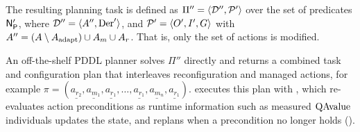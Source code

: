 The resulting planning task is defined as $\Pi'' = \langle \mathcal{D}'', \mathcal{P}' \rangle$ over the set of predicates $\mathsf{N}_\mathsf{P}'$, where $\mathcal{D}'' = \langle A'', \text{Der}' \rangle$, and $\mathcal{P}'= \langle O', I', G \rangle$ with $A'' = (A \setminus A_{\text{adapt}}) \cup A_m \cup A_r$. That is, only the set of actions is modified.

An off-the-shelf PDDL planner solves $\Pi''$ directly and returns a combined task and configuration plan that interleaves reconfiguration and managed actions, for example $\pi = (\underline{a_{r_2}}, \underline{a_{m_1}}, \underline{a_{r_1}}, \ldots, \underline{a_{r_1}}, \underline{a_{m_n}}, \underline{a_{r_1}})$. \planta executes this plan with \plansys, which re-evaluates action preconditions as runtime information such as measured $\operatorname{QAvalue}$ individuals updates the state, and replans when a precondition no longer holds (). %


